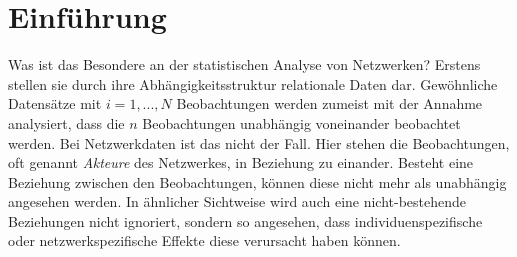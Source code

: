 \documentclass[a4paper,ngerman,oneside,titlepage,11pt]{scrreprt}
\theoremstyle{remark}
\begin{document}
\begin{abstract}


\begin{center}
{\it \bf Abstract} 
\end{center}
Dieser Bericht behandelt die Analyse der \emph{NISAT database of transfers of small arms, light weapons, and their ammunition, parts and accessories}. Die Netzwerkdaten stellen das internationale Kleinwaffenhandelsnetzwerk im Zeitraum 1992 bis 2011 dar.

Nachdem die Datengrundlage besprochen wird, erfolgt eine deskriptive Analyse des Handelsnetzwerkes anhand Zeitreihen von Netzwerkstatistiken. Im zweiten Teil wird der Querschnitt des Netzwerkes Jahr für Jahr anhand von ERGMs modelliert, um charakteristische Strukturen des Netzwerkes aufzudecken. Der Fokus liegt hierbei auf der Selektion interner Netzwerkstatistiken sowie externer Knotencharakteristika. Da dynamische Netzwerkdaten vorliegen, erfolgt im dritten Teil eine Analyse der Netzwerke anhand sogenannter \emph{Separable Temporal Exponential Graph Models} (STERGMs, Krivitsky and Handcock, 2010). Diese Modellklasse separiert zwischen Effekten zur Tie-Formation und Effekten zur Tie-Auflösung. Die Ergebnisse werden zusammengefasst.
% 


\end{abstract}



\tableofcontents




\chapter{Einführung}

Was ist das Besondere an der statistischen Analyse von Netzwerken? Erstens stellen sie durch ihre Abhängigkeitsstruktur relationale Daten dar. Gewöhnliche Datensätze mit $i = 1, ..., N$ Beobachtungen werden zumeist mit der Annahme analysiert, dass die $n$ Beobachtungen unabhängig voneinander beobachtet werden. Bei Netzwerkdaten ist das nicht der Fall. Hier stehen die Beobachtungen, oft genannt \emph{Akteure} des Netzwerkes, in Beziehung zu einander. Besteht eine Beziehung zwischen den Beobachtungen, können diese nicht mehr als unabhängig angesehen werden. In ähnlicher Sichtweise wird auch eine nicht-bestehende Beziehungen nicht ignoriert, sondern so angesehen, dass individuenspezifische oder netzwerkspezifische Effekte diese verursacht haben können.
\end{document}
